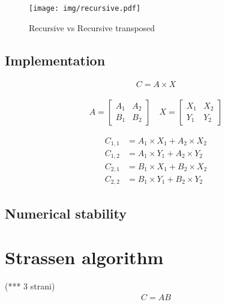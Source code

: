 \documentclass[a4paper,11pt]{article}
\begin{document}
\begin{figure}[h]
\centering
\texttt{[image: img/recursive.pdf]}
\caption{Recursive vs Recursive transposed}
\label{fig:classic}
\end{figure}

\subsection{Implementation}

\begin{align*}
C = A \times X
\end{align*}

\begin{align*}
A = 
\begin{bmatrix}
A_{1} & A_{2} \\
B_{1} & B_{2}
\end{bmatrix}
\quad
X = 
\begin{bmatrix}
X_{1} & X_{2} \\
Y_{1} & Y_{2}
\end{bmatrix}
\end{align*}

\begin{align*}
C_{1,1} &= A_{1} \times X_{1} + A_{2}  \times X_{2} \\
C_{1,2} &= A_{1} \times Y_{1} + A_{2}  \times Y_{2} \\
C_{2,1} &= B_{1} \times X_{1} + B_{2}  \times X_{2} \\
C_{2,2} &= B_{1} \times Y_{1} + B_{2}  \times Y_{2}
\end{align*}

\subsection{Numerical stability}

\section{Strassen algorithm}
(*** 3 strani)
\begin{align*}
C=AB
\end{align*}
\end{document}
